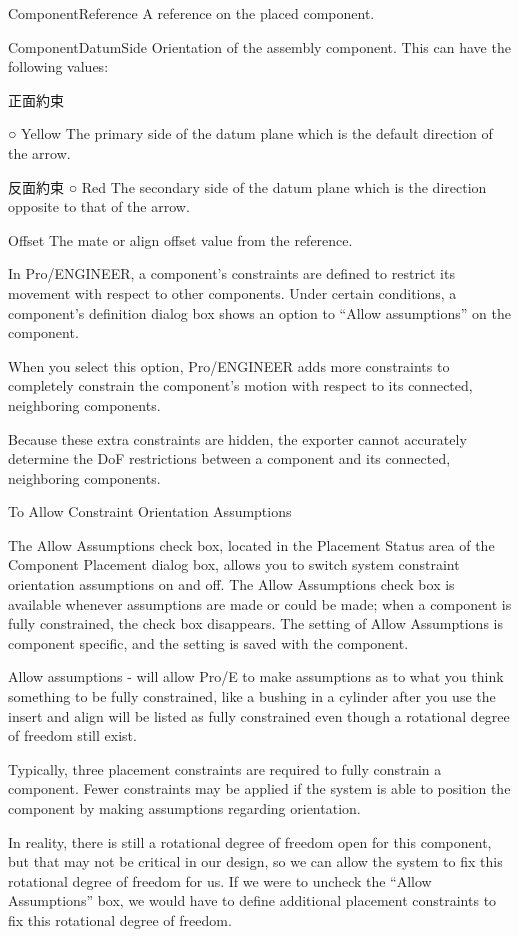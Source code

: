 \documentclass[]{article}
\begin{document}
ComponentReference A reference on the placed component.

ComponentDatumSide Orientation of the assembly component. This can have
the following values:

正面約束

○ Yellow The primary side of the datum plane which is the default
direction of the arrow.

反面約束 ○ Red The secondary side of the datum plane which is the
direction opposite to that of the arrow.

Offset The mate or align offset value from the reference.

In Pro/ENGINEER, a component's constraints are defined to restrict its
movement with respect to other components. Under certain conditions, a
component's definition dialog box shows an option to ``Allow
assumptions'' on the component.

When you select this option, Pro/ENGINEER adds more constraints to
completely constrain the component's motion with respect to its
connected, neighboring components.

Because these extra constraints are hidden, the exporter cannot
accurately determine the DoF restrictions between a component and its
connected, neighboring components.

To Allow Constraint Orientation Assumptions

The Allow Assumptions check box, located in the Placement Status area of
the Component Placement dialog box, allows you to switch system
constraint orientation assumptions on and off. The Allow Assumptions
check box is available whenever assumptions are made or could be made;
when a component is fully constrained, the check box disappears. The
setting of Allow Assumptions is component specific, and the setting is
saved with the component.

Allow assumptions - will allow Pro/E to make assumptions as to what you
think something to be fully constrained, like a bushing in a cylinder
after you use the insert and align will be listed as fully constrained
even though a rotational degree of freedom still exist.

Typically, three placement constraints are required to fully constrain a
component. Fewer constraints may be applied if the system is able to
position the component by making assumptions regarding orientation.

In reality, there is still a rotational degree of freedom open for this
component, but that may not be critical in our design, so we can allow
the system to fix this rotational degree of freedom for us. If we were
to uncheck the ``Allow Assumptions'' box, we would have to define
additional placement constraints to fix this rotational degree of
freedom.
\end{document}
